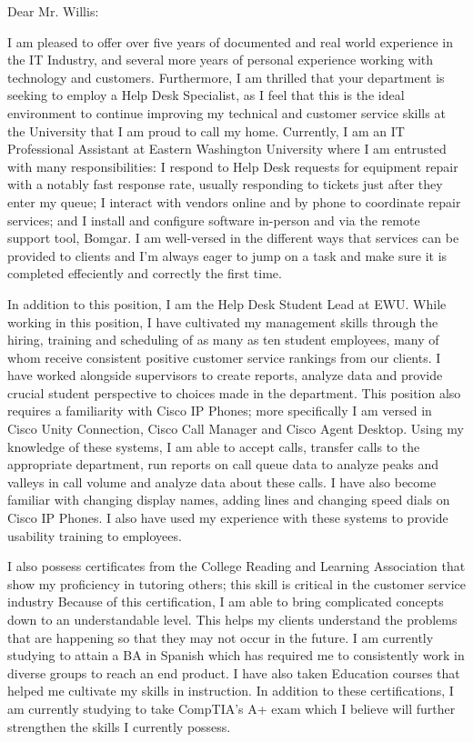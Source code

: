 \documentclass[a4paper,10pt]{article}
\begin{document}
Dear Mr. Willis:\\

\par
I am pleased to offer over five years of documented and real world experience in the IT Industry, and several more years of personal experience working with technology and customers. Furthermore, I am thrilled that your department is seeking to employ a Help Desk Specialist, as I feel that this is the ideal environment to continue improving my technical and customer service skills at the University that I am proud to call my home. Currently, I am an IT Professional Assistant at Eastern Washington University where I am entrusted with many responsibilities: I respond to Help Desk requests for equipment repair with a notably fast response rate, usually responding to tickets just after they enter my queue; I interact with vendors online and by phone to coordinate repair services; and I install and configure software in-person and via the remote support tool, Bomgar. I am well-versed in the different ways that services can be provided to clients and I'm always eager to jump on a task and make sure it is completed effeciently and correctly the first time. 
\par
In addition to this position, I am the Help Desk Student Lead at EWU. While working in this position, I have cultivated my management skills through the hiring, training and scheduling of as many as ten student employees, many of whom receive consistent positive customer service rankings from our clients. I have worked alongside supervisors to create reports, analyze data and provide crucial student perspective to choices made in the department. This position also requires a familiarity with Cisco IP Phones; more specifically I am versed in Cisco Unity Connection, Cisco Call Manager and Cisco Agent Desktop. Using my knowledge of these systems, I am able to accept calls, transfer calls to the appropriate department, run reports on call queue data to analyze peaks and valleys in call volume and analyze data about these calls. I have also become familiar with changing display names, adding lines and changing speed dials on Cisco IP Phones. I also have used my experience with these systems to provide usability training to employees.
\par
I also possess certificates from the College Reading and Learning Association that show my proficiency in tutoring others; this skill is critical in the customer service industry Because of this certification, I am able to bring complicated concepts down to an understandable level. This helps my clients understand the problems that are happening so that they may not occur in the future. I am currently studying to attain a BA in Spanish which has required me to consistently work in diverse groups to reach an end product. I have also taken Education courses that helped me cultivate my skills in instruction. In addition to these certifications, I am currently studying to take CompTIA's A+ exam which I believe will further strengthen the skills I currently possess.\\
\end{document}
